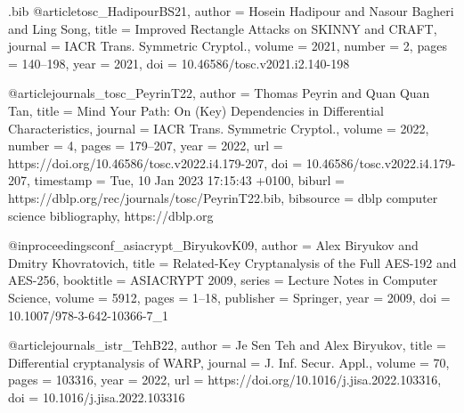 \documentclass[table,aspectratio=169]{beamer}
\begin{document}
\begin{filecontents*}[overwrite]{\jobname.bib}
@article{tosc_HadipourBS21,
  author    = {Hosein Hadipour and
               Nasour Bagheri and
               Ling Song},
  title     = {Improved Rectangle Attacks on {SKINNY} and {CRAFT}},
  journal   = {{IACR} Trans. Symmetric Cryptol.},
  volume    = {2021},
  number    = {2},
  pages     = {140--198},
  year      = {2021},
  doi       = {10.46586/tosc.v2021.i2.140-198}
}

@article{journals_tosc_PeyrinT22,
  author    = {Thomas Peyrin and
               Quan Quan Tan},
  title     = {Mind Your Path: On (Key) Dependencies in Differential Characteristics},
  journal   = {{IACR} Trans. Symmetric Cryptol.},
  volume    = {2022},
  number    = {4},
  pages     = {179--207},
  year      = {2022},
  url       = {https://doi.org/10.46586/tosc.v2022.i4.179-207},
  doi       = {10.46586/tosc.v2022.i4.179-207},
  timestamp = {Tue, 10 Jan 2023 17:15:43 +0100},
  biburl    = {https://dblp.org/rec/journals/tosc/PeyrinT22.bib},
  bibsource = {dblp computer science bibliography, https://dblp.org}
}

@inproceedings{conf_asiacrypt_BiryukovK09,
	author    = {Alex Biryukov and
		Dmitry Khovratovich},
	title     = {Related-Key Cryptanalysis of the Full {AES-192} and {AES-256}},
	booktitle = {{ASIACRYPT} 2009},
	series    = {Lecture Notes in Computer Science},
	volume    = {5912},
	pages     = {1--18},
	publisher = {Springer},
	year      = {2009},
	doi       = {10.1007/978-3-642-10366-7_1}
}

@article{journals_istr_TehB22,
  author    = {Je Sen Teh and
               Alex Biryukov},
  title     = {Differential cryptanalysis of {WARP}},
  journal   = {J. Inf. Secur. Appl.},
  volume    = {70},
  pages     = {103316},
  year      = {2022},
  url       = {https://doi.org/10.1016/j.jisa.2022.103316},
  doi       = {10.1016/j.jisa.2022.103316}
}

\end{filecontents*}
\end{document}
